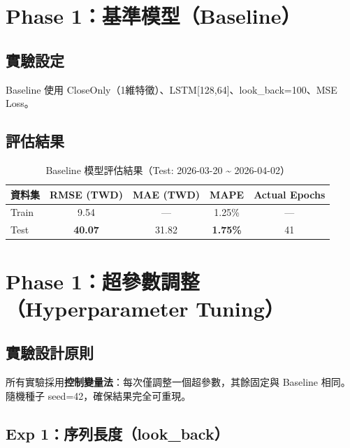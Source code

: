 \documentclass[12pt,a4paper]{article}
\begin{document}
\section{Phase 1：基準模型（Baseline）}

\subsection{實驗設定}

Baseline 使用 CloseOnly（1維特徵）、LSTM[128,64]、look\_back=100、MSE Loss。

\subsection{評估結果}

\begin{table}[H]
\centering
\caption{Baseline 模型評估結果（Test: 2026-03-20 \textasciitilde{} 2026-04-02）}
\begin{tabular}{lcccc}
\toprule
\textbf{資料集} & \textbf{RMSE (TWD)} & \textbf{MAE (TWD)} & \textbf{MAPE} & \textbf{Actual Epochs} \\
\midrule
Train & 9.54 & — & 1.25\% & — \\
\rowcolor{bestrow}
Test  & \textbf{40.07} & 31.82 & \textbf{1.75\%} & 41 \\
\bottomrule
\end{tabular}
\end{table}

\section{Phase 1：超參數調整（Hyperparameter Tuning）}

\subsection{實驗設計原則}

所有實驗採用\textbf{控制變量法}：每次僅調整一個超參數，其餘固定與 Baseline 相同。隨機種子 seed=42，確保結果完全可重現。

\subsection{Exp 1：序列長度（look\_back）}
\end{document}
